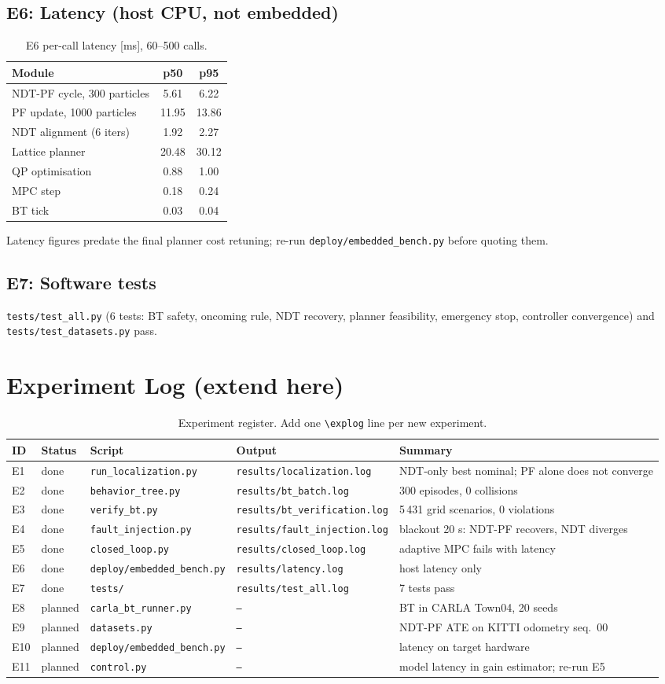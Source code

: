 \documentclass[conference]{IEEEtran}
\newcommand{\explog}[5]{#1 & #2 & \texttt{#3} & \texttt{#4} & #5 \\}
\begin{document}
\subsection{E6: Latency (host CPU, not embedded)}
\begin{table}[t]\centering\caption{E6 per-call latency [ms], 60--500 calls.}\small
\begin{tabular}{@{}lcc@{}}\toprule Module & p50 & p95\\\midrule
NDT-PF cycle, 300 particles & 5.61 & 6.22\\ PF update, 1000 particles & 11.95 & 13.86\\
NDT alignment (6 iters) & 1.92 & 2.27\\ Lattice planner & 20.48 & 30.12\\
QP optimisation & 0.88 & 1.00\\ MPC step & 0.18 & 0.24\\ BT tick & 0.03 & 0.04\\\bottomrule\end{tabular}\end{table}
Latency figures predate the final planner cost retuning; re-run \texttt{deploy/embedded\_bench.py} before quoting them.

\subsection{E7: Software tests}
\texttt{tests/test\_all.py} (6 tests: BT safety, oncoming rule, NDT recovery, planner feasibility, emergency stop, controller convergence) and \texttt{tests/test\_datasets.py} pass.

\section{Experiment Log (extend here)}
\begin{table}[t]\centering\caption{Experiment register. Add one \texttt{\textbackslash explog} line per new experiment.}\small
\scriptsize\begin{tabular}{@{}lllp{3.6cm}p{6.2cm}@{}}\toprule ID & Status & Script & Output & Summary\\\midrule
\explog{E1}{done}{run\_localization.py}{results/localization.log}{NDT-only best nominal; PF alone does not converge}
\explog{E2}{done}{behavior\_tree.py}{results/bt\_batch.log}{300 episodes, 0 collisions}
\explog{E3}{done}{verify\_bt.py}{results/bt\_verification.log}{5\,431 grid scenarios, 0 violations}
\explog{E4}{done}{fault\_injection.py}{results/fault\_injection.log}{blackout 20 s: NDT-PF recovers, NDT diverges}
\explog{E5}{done}{closed\_loop.py}{results/closed\_loop.log}{adaptive MPC fails with latency}
\explog{E6}{done}{deploy/embedded\_bench.py}{results/latency.log}{host latency only}
\explog{E7}{done}{tests/}{results/test\_all.log}{7 tests pass}
\explog{E8}{planned}{carla\_bt\_runner.py}{--}{BT in CARLA Town04, 20 seeds}
\explog{E9}{planned}{datasets.py}{--}{NDT-PF ATE on KITTI odometry seq.\ 00}
\explog{E10}{planned}{deploy/embedded\_bench.py}{--}{latency on target hardware}
\explog{E11}{planned}{control.py}{--}{model latency in gain estimator; re-run E5}
\bottomrule\end{tabular}\end{table}
\end{document}
